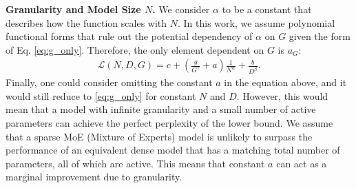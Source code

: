 \textbf{Granularity and Model Size $N$.}  
We consider \( \alpha \) to be a constant that describes how the function scales with \( N \). In this work, we assume polynomial functional forms that rule out the potential dependency of $\alpha$ on $G$ given the form of Eq. \ref{eq:g_only}. 
Therefore, %
the only element dependent on $G$ is $a_G$:
\begin{align}\label{eq:loss_moe}
    \mathcal{L}(N, D, G) = c + \left(\frac{g}{G^\gamma} + a\right)\frac{1}{N^\alpha} + \frac{b}{D^\beta}.
\end{align}
Finally, one could consider omitting the constant $a$ in the equation above, and it would still reduce to \ref{eq:g_only} for constant $N$ and $D$. However, this would mean that a model with infinite granularity and a small number of active parameters can achieve the perfect perplexity of the lower bound.  We assume that a sparse MoE (Mixture of Experts) model is unlikely to surpass the performance of an equivalent dense model that has a matching total number of parameters, all of which are active. This means that constant $a$ can act as a marginal improvement due to granularity.





